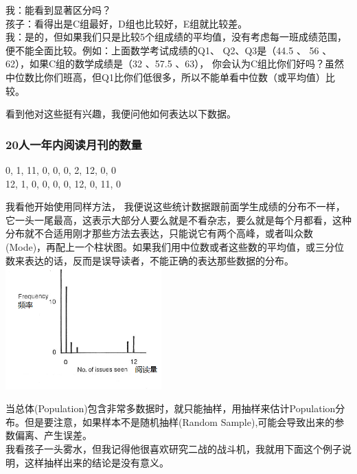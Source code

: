 我：能看到显著区分吗？\\
孩子：看得出是C组最好，D组也比较好，E组就比较差。\\
我：是的，但如果我们只是比较5个组成绩的平均值，没有考虑每一班成绩范围，便不能全面比较。例如：上面数学考试成绩的Q1、
Q2、Q3是（44.5 、 56 、62），如果C组的数学成绩是（32 、57.5 、63），
你会认为C组比你们好吗？虽然中位数比你们班高，但Q1比你们低很多，所以不能单看中位数（或平均值）比较。

看到他对这些挺有兴趣，我便问他如何表达以下数据。\\

\hypertarget{ux4ebaux4e00ux5e74ux5185ux9605ux8bfbux6708ux520aux7684ux6570ux91cf}{%
\subsubsection{20人一年内阅读月刊的数量}\label{ux4ebaux4e00ux5e74ux5185ux9605ux8bfbux6708ux520aux7684ux6570ux91cf}}

0, 1, 11, 0, 0, 0, 2, 12, 0, 0\\
12, 1, 0, 0, 0, 0, 12, 0, 11, 0

我看他开始使用同样方法，
我便说这些统计数据跟前面学生成绩的分布不一样，它一头一尾最高，这表示大部分人要么就是不看杂志，要么就是每个月都看，这种分布就不合适用刚才那些方法去表达，只能说它有两个高峰，或者叫众数(Mode)，再配上一个柱状图。如果我们用中位数或者这些数的平均值，或三分位数来表达的话，反而是误导读者，不能正确的表达那些数据的分布。\\

\includegraphics[width=6cm]{MA_FA4_10.png}

当总体(Population)包含非常多数据时，就只能抽样，用抽样来估计Population分布。但是要注意，如果样本不是随机抽样(Random Sample),可能会导致出来的参数偏离、产生误差。\\
我看孩子一头雾水，但我记得他很喜欢研究二战的战斗机，我就用下面这个例子说明，这样抽样出来的结论是没有意义。\\

